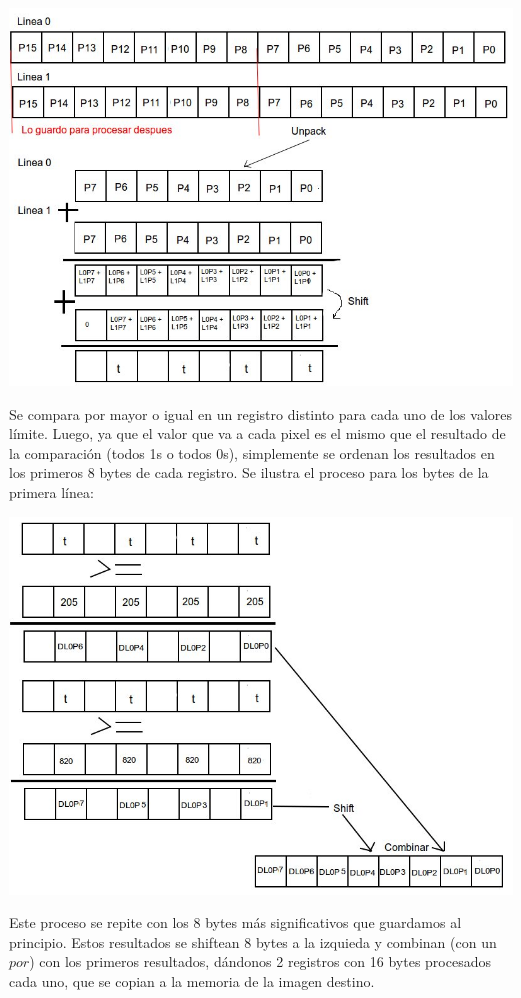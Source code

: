 \includegraphics[width=\textwidth]{halftone2.jpg} 

Se compara por mayor o igual en un registro distinto para cada uno de los valores límite.
Luego, ya que  el valor que va a cada pixel es el mismo que el resultado de la comparación (todos 1s o todos 0s), simplemente se ordenan los resultados en los primeros 8 bytes de cada registro.
Se ilustra el proceso para los bytes de la primera línea:

\includegraphics[width=\textwidth]{halftone3.jpg} 

Este proceso se repite con los 8 bytes más significativos que guardamos al principio. Estos resultados se shiftean 8 bytes a la izquieda y combinan (con un $por$) con los primeros resultados, dándonos 2 registros con 16 bytes procesados cada uno, que se copian a la memoria de la imagen destino.


